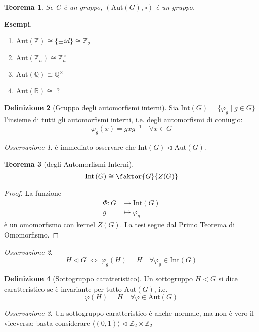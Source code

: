 \documentclass[a4paper]{article}
\newtheorem{theorem}{Teorema}[section]
\theoremstyle{remark}
\newtheorem*{remark}{Osservazione}
\theoremstyle{definition}
\newtheorem{definition}[theorem]{Definizione}
\newcommand{\Aut}[1]{\mathrm{Aut}\left( #1 \right)}
\newcommand{\Int}[1]{\mathrm{Int}\left( #1 \right)}
\newcommand{\fun}[5]{\begin{align*}
	#1 \colon #2 &\to #3 \\
	#4 &\mapsto #5
	\end{align*}}
\begin{document}
\begin{multicols}{2}
\begin{theorem}
	Se G è un gruppo, $ \left(\Aut{G}, \circ\right) $ è un gruppo.
\end{theorem}

\textbf{Esempi}.
\begin{enumerate}
	\item $ \Aut{\mathbb{Z}} \cong \{\pm id\} \cong \mathbb{Z}_2 $
	\item $ \Aut{\mathbb{Z}_n} \cong \mathbb{Z}_n^\times $
	\item $ \Aut{\mathbb{Q}} \cong \mathbb{Q}^\times $
	\item $ \Aut{\mathbb{R}} \cong \; ? $
\end{enumerate} 

\begin{definition}[Gruppo degli automorfismi interni]
	Sia $ \Int{G} = \{ \varphi_g \mid g \in G \} $ l'insieme di tutti gli automorfismi interni, i.e. degli automorfismi di coniugio: \[ \varphi_g(x) = gxg^{-1} \quad\forall x \in G \]
\end{definition}
\begin{remark}
	è immediato osservare che $ \Int{G} \lhd \Aut{G} $.
\end{remark}
\begin{theorem}[degli Automorfismi Interni]
	\[ \Int{G} \cong \faktor{G}{Z(G)} \]
\end{theorem}
\begin{proof}
	La funzione \fun{\Phi}{G}{\Int{G}}{g}{\varphi_g} è un omomorfismo con kernel $ Z(G) $. La tesi segue dal Primo Teorema di Omomorfismo.
\end{proof}

\begin{remark}
	\[ H \lhd G \;\Leftrightarrow\; \varphi_g\left(H\right) = H \quad \forall \varphi_g \in \Int{G} \]
\end{remark}

\begin{definition}[Sottogruppo caratteristico]
	Un sottogruppo $ H < G $ si dice caratteristico se è invariante per tutto $ \Aut{G} $, i.e. $$ \varphi\left(H\right) = H \quad \forall \varphi \in \Aut{G} $$
\end{definition}
\begin{remark}
	Un sottogruppo caratteristico è anche normale, ma non è vero il viceversa: basta considerare $ \langle (0, 1) \rangle \lhd \mathbb{Z}_2 \times \mathbb{Z}_2 $
\end{remark}


\end{multicols}
\end{document}
